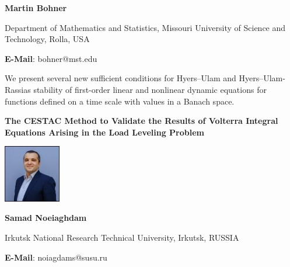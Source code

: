 \documentclass[twoside,11pt]{amsart}
\begin{document}
\centerline{\textbf{  Martin Bohner }}
\vskip 2mm
\begin{flushleft}
Department of Mathematics and Statistics, Missouri University of Science and Technology, Rolla, USA
\end{flushleft}
\vskip 2mm
\begin{flushleft}
\textbf{E-Mail}: bohner@mst.edu
\end{flushleft}

\vskip 10mm
We present several new sufficient conditions for Hyers–Ulam and Hyers–Ulam-Rassias
stability of first-order linear and nonlinear dynamic equations for functions defined on a
time scale with values in a Banach space.
\vskip 5mm
\begin{flushleft}
{\bf }
\end{flushleft}
\newpage
\vskip 10mm
\begin{center}\bf\LARGE
The CESTAC Method to Validate the Results of Volterra Integral Equations Arising in the Load Leveling Problem
\end{center}
\vskip 5mm
\begin{center}
\includegraphics[width=2.5cm, height=2.5cm, keepaspectratio=false]{SN2.jpg}
\end{center}
\vskip 2mm

\centerline{\textbf{  Samad Noeiaghdam }}
\vskip 2mm
\begin{flushleft}
Irkutsk National Research Technical University, Irkutsk, RUSSIA
\end{flushleft}
\vskip 2mm
\begin{flushleft}
\textbf{E-Mail}:  noiagdams@susu.ru
\end{flushleft}
\end{document}
